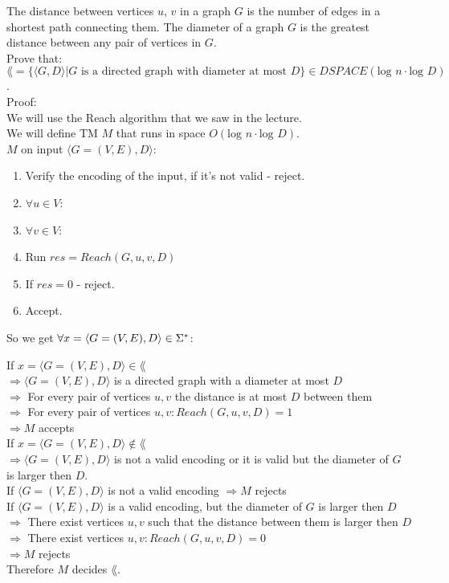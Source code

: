 The distance between vertices $u$, $v$ in a graph $G$ is the number of edges in a
shortest path connecting them. The diameter of a graph $G$ is the greatest
distance between any pair of vertices in $G$. \\
Prove that: \\
$\lang = \{\langle G, D \rangle | G \text{ is a directed graph with diameter at most } D \}
    \in DSPACE(\text{log }n \cdot \text{log }D)$. \\
Proof: \\
We will use the Reach algorithm that we saw in the lecture. \\
We will define TM $M$ that runs in space $O(\text{log }n \cdot \text{log }D)$. \\
$M$ on input $\langle G = (V,E), D \rangle$:

\begin{enumerate}[1., itemsep=5pt]
    \item Verify the encoding of the input, if it's not valid - reject.

    \item $\forall u \in V$:
    \item \qquad $\forall v \in V$:
    \item \qquad \qquad Run $res = Reach(G, u, v, D)$
    \item \qquad \qquad If $res = 0$ - reject.
    \item Accept.

\end{enumerate}

So we get $\forall x=\langle G = (V,E), D \rangle \in \Sigma^*$:

If $x=\langle G = (V,E), D \rangle \in \lang$ \\
$\Longrightarrow \langle G = (V,E), D \rangle$ is a directed graph with a diameter at most $D$  \\
$\Longrightarrow$ For every pair of vertices $u, v$ the distance is at most $D$ between them  \\
$\Longrightarrow$ For every pair of vertices $u, v: Reach(G, u, v, D) = 1$  \\
$\Longrightarrow M$ accepts \\

If $x=\langle G = (V,E), D \rangle \notin \lang$ \\
$\Longrightarrow \langle G = (V,E), D \rangle$ is not a valid encoding or it is valid but the diameter of $G$ is larger then $D$. \\
If $\langle G = (V,E), D \rangle$ is not a valid encoding $\Longrightarrow M$ rejects \\
If $\langle G = (V,E), D \rangle$ is a valid encoding, but the diameter of $G$ is larger then $D$ \\
$\Longrightarrow $ There exist vertices $u, v$ such that the distance between them is larger then $D$ \\
$\Longrightarrow $ There exist vertices $u, v: Reach(G, u, v, D) = 0$ \\
$\Longrightarrow M$ rejects \\
Therefore $M$ decides $\lang$. \\


